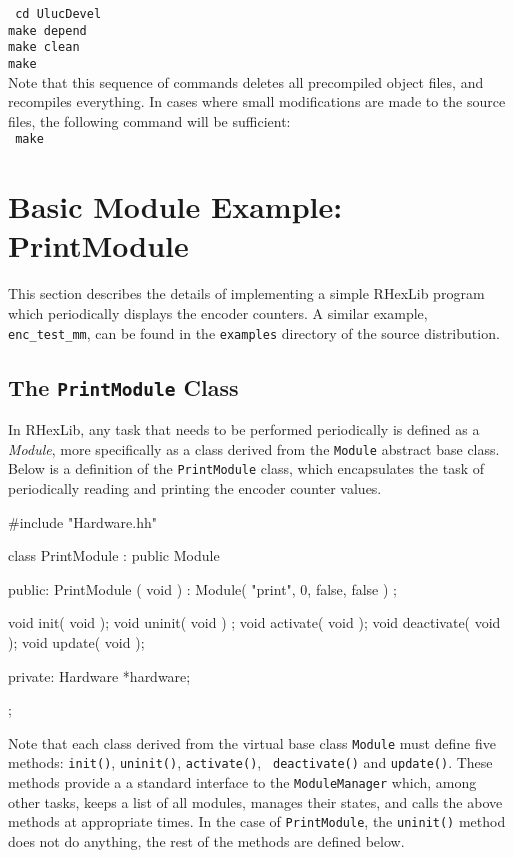 {\tt
\noindent cd UlucDevel \\
make depend \\
make clean \\
make
}\\

Note that this sequence of commands deletes all precompiled object files,
and recompiles everything. In cases where small modifications are made to
the source files, the following command will be sufficient:\\

{\tt
\noindent make
}\\

\section{Basic Module Example: PrintModule}

This section describes the details of implementing a simple RHexLib program
which periodically displays the encoder counters. A similar example, {\tt
enc\_test\_mm}, can be found in the {\tt examples} directory of the source
distribution.

\subsection{The {\tt PrintModule} Class}

In RHexLib, any task that needs to be performed periodically is defined as 
a {\em Module}, more specifically as a class derived from the {\tt Module}
abstract base class. Below is a definition of the {\tt PrintModule} class,
which encapsulates the task of periodically reading and printing the encoder 
counter values.

\begin{codesegment}
#include "Hardware.hh"

class PrintModule : public Module {

public:
  PrintModule ( void ) : Module( "print", 0, false, false ) { };

  void init( void );
  void uninit( void ) { };
  void activate( void );
  void deactivate( void );
  void update( void );

private:
  Hardware *hardware;
};
\end{codesegment}

Note that each class derived from the virtual base class {\tt Module} must
define five methods: {\tt init()}, {\tt uninit()}, {\tt activate()}, {\tt
deactivate()} and {\tt update()}. These methods provide a a standard
interface to the {\tt ModuleManager} which, among other tasks, keeps a list
of all modules, manages their states, and calls the above methods at
appropriate times. In the case of {\tt PrintModule}, the {\tt uninit()}
method does not do anything, the rest of the methods are defined below.

